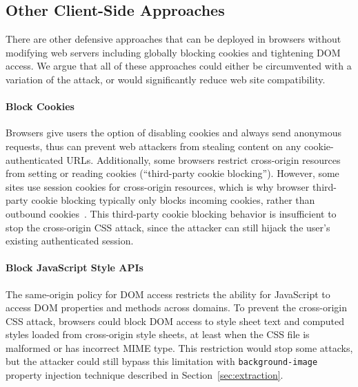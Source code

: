 \documentclass{acm_proc_article-sp}
\begin{document}
\subsection{Other Client-Side Approaches}
There are other defensive approaches that can be deployed in browsers without modifying web servers including globally blocking cookies and tightening DOM access.  We argue that all of these approaches could either be circumvented with a variation of the attack, or would significantly reduce web site compatibility.

\paragraph{Block Cookies} 
Browsers give users the option of disabling cookies
and always send anonymous requests, thus can prevent web attackers from
stealing content on any cookie-authenticated URLs. Additionally, some browsers
restrict cross-origin resources from setting or reading cookies (``third-party
cookie blocking''). However, some sites use session cookies for cross-origin
resources, which is why browser third-party cookie blocking typically only
blocks incoming cookies, rather than outbound
cookies~\cite{jackson06thirdpartycookies}. This third-party cookie blocking
behavior is insufficient to stop the cross-origin CSS attack, since the
attacker can still hijack the user's existing authenticated session.

\paragraph{Block JavaScript Style APIs}
The same-origin policy for DOM access restricts the ability for JavaScript to
access DOM properties and methods across domains. To prevent the cross-origin
CSS attack, browsers could block DOM access to style sheet text and computed
styles loaded from cross-origin style sheets, at least when the CSS file is
malformed or has incorrect MIME type. This restriction would stop some
attacks, but the attacker could still bypass this limitation with
\texttt{background-image} property injection technique described in
Section~\ref{sec:extraction}.

\end{document}
